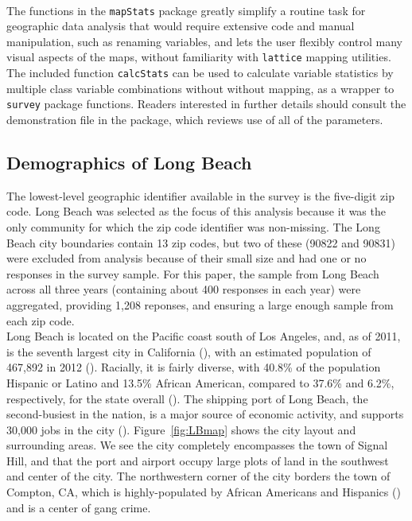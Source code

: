 \\\indent
The functions in the \texttt{mapStats} package greatly simplify a routine task for geographic data analysis that would require extensive code and manual manipulation, such as renaming variables, and lets the user flexibly control many visual aspects of the maps, without familiarity with \texttt{lattice} mapping utilities.  The included function \texttt{calcStats} can be used to calculate variable statistics by multiple class variable combinations without without mapping, as a wrapper to \texttt{survey} package functions.  Readers interested in further details should consult the demonstration file in the package, which reviews use of all of the parameters.
\subsection{Demographics of Long Beach}
The lowest-level geographic identifier available in the survey is the five-digit zip code.  Long Beach was selected as the focus of this analysis because it was the only community for which the zip code identifier was non-missing.  The Long Beach city boundaries contain 13 zip codes, but two of these (90822 and 90831) were excluded from analysis because of their small size and had one or no responses in the survey sample.  For this paper, the sample from Long Beach across all three years (containing about 400 responses in each year) were aggregated, providing 1,208 reponses, and ensuring a large enough sample from each zip code.\\
\indent
Long Beach is located on the Pacific coast south of Los Angeles, and, as of 2011, is the seventh largest city in California (\citealt{CADoF}), with an estimated population of 467,892 in 2012 (\citealt{CenFacts}).  Racially, it is fairly diverse, with 40.8\% of the population Hispanic or Latino and 13.5\% African American, compared to 37.6\% and 6.2\%, respectively,
for the state overall (\citealt{CenFacts}).  The shipping port of Long Beach, the second-busiest in the nation, is a major source of economic activity, and supports 30,000 jobs in the city (\citealt{LBPort}).  Figure~\ref{fig:LBmap} shows the city layout and surrounding areas.  We see the city completely encompasses the town of Signal Hill, and that the port and airport 
occupy large plots of land in the southwest and center of the city.  The northwestern corner of the city borders the town of Compton, CA, which is highly-populated by African Americans and Hispanics (\citealt{CenFacts}) and is a center of gang crime.

